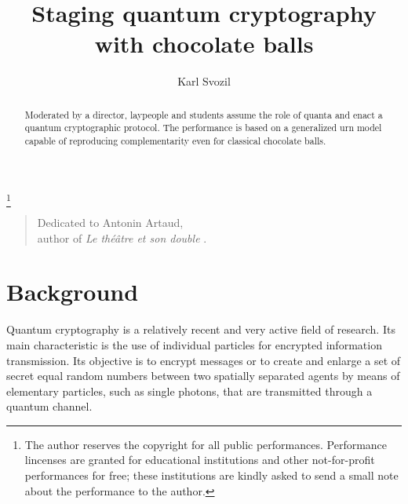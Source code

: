 \documentclass[prb,amssymb,preprint]{revtex4}
\begin{document}
\title{Staging quantum cryptography with chocolate balls}

\thanks{The author reserves the copyright for all public performances.
Performance lincenses are granted for educational institutions
and other not-for-profit performances for free;
these institutions are kindly asked to send a small note about the
performance to the author.}

\author{Karl Svozil}

\begin{abstract}
Moderated by a director, laypeople and students assume the
role of quanta and enact a quantum cryptographic protocol. The performance
is based on a generalized urn model capable of reproducing complementarity
even for classical chocolate balls.
\end{abstract}



\maketitle

\begin{quote}
\begin{flushright}
{%
Dedicated to Antonin Artaud, \\
author of {\it Le th{\'{e}}{\^{a}}tre et son double} \cite{Arthaud}.
 }
\end{flushright}
\end{quote}

\section{Background}

Quantum cryptography is a relatively recent and very active field of
research. Its main characteristic is the use of individual particles for
encrypted information transmission. Its objective is to encrypt messages or
to create and enlarge a set of secret equal random numbers between two
spatially separated agents by means of elementary particles, such as single
photons, that are transmitted through a quantum channel.
\end{document}
